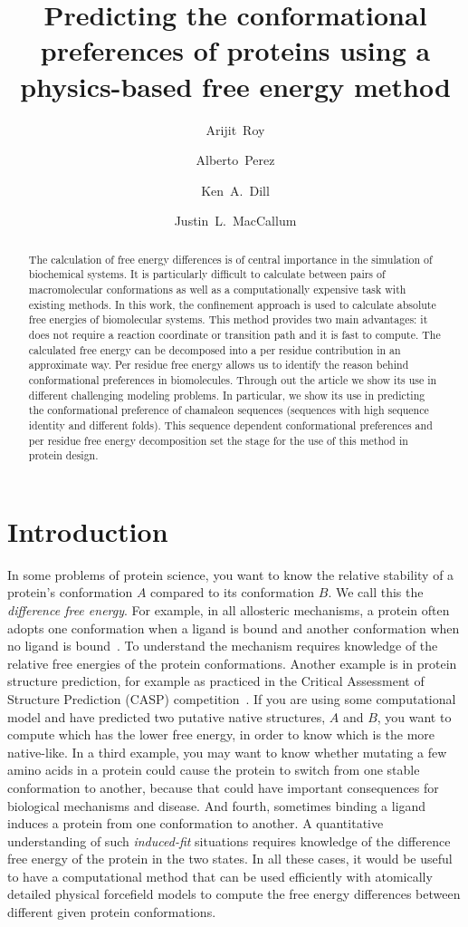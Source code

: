 \documentclass[12pt]{article}
\author{Arijit~Roy}
\author{Alberto~Perez}
\author{Ken~A.~Dill}
\author{Justin~L.~MacCallum}
\affil{Laufer Center for Physical and Quantitative Biology\\
    and Departments of Physics and Chemistry\\
    Stony Brook University\\
    Stony Brook, NY 11794-5252.}
\title{Predicting the conformational preferences of proteins using a physics-based free energy
method}
\begin{document}
\maketitle

\begin{abstract}

The calculation of free energy differences is of central importance in the simulation of biochemical
systems. It is particularly difficult to calculate between pairs of macromolecular conformations as
well as a computationally expensive task with existing methods. In this work, the confinement approach
is used to calculate absolute free energies of biomolecular systems. This method provides two main
advantages: it does not require a reaction coordinate or transition path and it is fast to compute.
The calculated free energy can be decomposed into a per residue contribution in an approximate way. Per
residue free energy allows us to identify the reason behind conformational preferences in
biomolecules. Through out the article we show its use in different challenging modeling problems. In
particular, we show its use in predicting the conformational preference of chamaleon sequences
(sequences with high sequence identity and different folds). This sequence dependent conformational
preferences and per residue free energy decomposition set the stage for the use of this method in
protein design.

\end{abstract}

\section*{Introduction}

In some problems of protein science, you want to know the relative stability of a protein's conformation $A$ compared to
its conformation $B$.  We call this the \emph{difference free energy}. For example, in all allosteric mechanisms, a protein
often adopts one conformation when a ligand is bound and another conformation when no ligand is bound~\cite{Elber2007}.
To understand the mechanism requires knowledge of the relative free energies of the protein conformations.  Another
example is in protein structure prediction, for example as practiced in the Critical Assessment of Structure Prediction
(CASP) competition~\cite{Moult2011}. If you are using some computational model and have predicted two putative native
structures, $A$ and $B$, you want to compute which has the lower free energy, in order to know which is the more
native-like.  In a third example, you may want to know whether mutating a few amino acids in a protein could cause the
protein to switch from one stable conformation to another, because that could have important consequences for biological
mechanisms and disease. And fourth, sometimes binding a ligand induces a protein from one conformation to another. A
quantitative understanding of such \emph{induced-fit} situations requires knowledge of the difference free energy of the
protein in the two states. In all these cases, it would be useful to have a computational method that can be used
efficiently with atomically detailed physical forcefield models to compute the free energy differences between different
given protein conformations.
\end{document}
